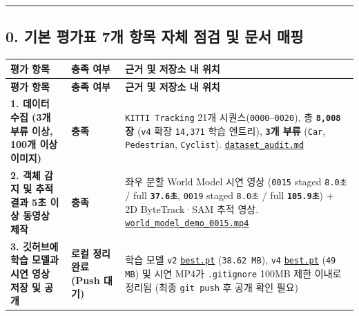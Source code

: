 \documentclass[10.5pt,a4paper]{article}
\begin{document}
\par\noindent\rule{\textwidth}{0.4pt}\par\medskip

\subsection{0. 기본 평가표 7개 항목 자체 점검 및 문서 매핑}


\begin{footnotesize}
\setlength{\tabcolsep}{4pt}
\setlength{\LTleft}{0pt}\setlength{\LTright}{0pt}
\begin{longtable}{>{\raggedright\arraybackslash}p{} >{\raggedright\arraybackslash}p{} >{\raggedright\arraybackslash}p{}}
\toprule
\textbf{평가 항목} & \textbf{충족 여부} & \textbf{근거 및 저장소 내 위치} \\
\midrule
\endfirsthead
\toprule
\textbf{평가 항목} & \textbf{충족 여부} & \textbf{근거 및 저장소 내 위치} \\
\midrule
\endhead
\bottomrule
\endfoot
\textbf{1. 데이터 수집 (3개 부류 이상, 100개 이상 이미지)} & \textbf{충족} & \texttt{KITTI Tracking} 21개 시퀀스(\texttt{0000}--\texttt{0020}), 총 \textbf{\texttt{8,\allowbreak{}008}장} (\texttt{v4} 확장 \texttt{14,\allowbreak{}371} 학습 엔트리), \textbf{\texttt{3}개 부류} (\texttt{Car}, \texttt{Pedestrian}, \texttt{Cyclist}). \href{https://github.com/Heisnotanimposter/Totalcare\_autonomous\_driving\_Yolov5/blob/main/dataset\_audit.md}{\texttt{dataset\_\allowbreak{}audit.\allowbreak{}md}} \\
\textbf{2. 객체 감지 및 추적 결과 5초 이상 동영상 제작} & \textbf{충족} & 좌우 분할 World Model 시연 영상 (\texttt{0015} staged \texttt{8.\allowbreak{}0초} / full \textbf{\texttt{37.\allowbreak{}6초}}, \texttt{0019} staged \texttt{8.\allowbreak{}0초} / full \textbf{\texttt{105.\allowbreak{}9초}}) + 2D ByteTrack·SAM 추적 영상. \href{https://github.com/Heisnotanimposter/Totalcare\_autonomous\_driving\_Yolov5/blob/main/results/v4\_road\_lane/world\_outputs/v4\_world\_outputs/world\_model\_0015\_full/world\_model\_demo\_0015.mp4}{\texttt{world\_\allowbreak{}model\_\allowbreak{}demo\_\allowbreak{}0015.\allowbreak{}mp4}} \\
\textbf{3. 깃허브에 학습 모델과 시연 영상 저장 및 공개} & \textbf{로컬 정리 완료 (Push 대기)} & 학습 모델 \texttt{v2} \href{https://github.com/Heisnotanimposter/Totalcare\_autonomous\_driving\_Yolov5/blob/main/results/v2\_improved/outputs/weights/best.pt}{\texttt{best.\allowbreak{}pt}} (\texttt{38.\allowbreak{}62 MB}), \texttt{v4} \href{https://github.com/Heisnotanimposter/Totalcare\_autonomous\_driving\_Yolov5/blob/main/results/v4\_road\_lane/detect\_outputs/outputs/weights/best.pt}{\texttt{best.\allowbreak{}pt}} (\texttt{49 MB}) 및 시연 MP4가 \texttt{.\allowbreak{}gitignore} 100MB 제한 이내로 정리됨 (최종 \texttt{git push} 후 공개 확인 필요) \\

\end{longtable}
\end{footnotesize}
\end{document}
